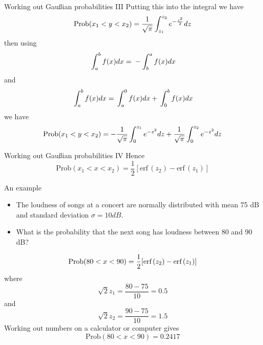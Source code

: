 \documentclass{beamer}
\begin{document}
\begin{frame}{Working out Gau\ss{}ian probabilities III}
Putting this into the integral we have
\color{reddish}
$$
\mbox{Prob}(x_1<y<x_2)=\frac{1}{\sqrt{\pi}}\color{greenish}{}\int_{z_1}^{z_2}\color{reddish}{} e^{-\frac{z^2}{2}}dz
$$
\color{black}{}
then using
\color{reddish}
$$
\color{greenish}{}\int_a^b\color{reddish}f(x)dx=\color{greenish}{}-\int_b^a\color{reddish} f(x)dx
$$
\color{black}{}
and
\color{reddish}
$$
\color{greenish}{}\int_a^b\color{reddish}f(x)dx=\color{greenish}{}\int_a^0\color{reddish} f(x)dx+\color{greenish}{}\int_0^b\color{reddish} f(x)dx
$$
\color{black}{}
we have
\color{reddish}
$$
\mbox{Prob}(x_1<y<x_2)=-\frac{1}{\sqrt{\pi}}\color{greenish}{}\int_{0}^{z_1}\color{reddish}{} e^{-z^2}dz+\frac{1}{\sqrt{\pi}}\color{greenish}{}\int_{0}^{z_2}\color{reddish} e^{-z^2}dz
$$
\color{black}
\end{frame}

\begin{frame}{Working out Gau\ss{}ian probabilities IV}
Hence
\color{purple}
$$
\mbox{Prob}(x_1<x<x_2)=\frac{1}{2}[\mbox{erf}\,(z_2)-\mbox{erf}\,(z_1)]
$$
\color{black}{}
\end{frame}

\begin{frame}{An example}
\begin{itemize}
\item The loudness of songs at a concert are normally distributed with mean 75 dB and standard deviation\color{reddish}{} $\sigma=10 dB$\color{black}{}. 
\item What is the probability that the next song has loudness between 80 and 90 dB?
\end{itemize}
\color{reddish}
$$
\mbox{Prob}(80<x<90)=\frac{1}{2}[\mbox{erf}\,(\color{blueish}{}z_2\color{reddish})-\mbox{erf}\,(\color{blueish}{}z_1\color{reddish})]
$$
\color{black}
where 
\color{blueish}{}
$$
\sqrt{2}z_1=\frac{80-75}{10}=0.5
$$
\color{black}{}
and 
\color{blueish}{}
$$
\sqrt{2}z_2=\frac{90-75}{10}=1.5
$$
\color{black}{}
Working out numbers on a calculator or computer gives
\color{reddish}
$$
\mbox{Prob}(80<x<90)=0.2417
$$
\color{black}{}
\end{frame}
\end{document}
